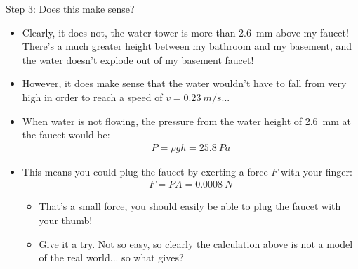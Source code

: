 \documentclass[aspectratio=169,
hyperref={colorlinks,urlcolor=blue}
]{beamer}
\begin{document}
\begin{frame}{Step 3: Does this make sense?}
\begin{itemize}
\item Clearly, it does not, the water tower is more than \SI{2.6}{mm} above my faucet! There's a much greater height between my bathroom and my basement, and the water doesn't explode out of my basement faucet!
\item However, it does make sense that the water wouldn't have to fall from very high in order to reach a speed of $v = \SI{0.23}{m/s}$...
\item When water is not flowing, the pressure from the water height of \SI{2.6}{mm} at the faucet would be:
\begin{align*}
P=\rho gh = \SI{25.8}{Pa}
\end{align*}
\item This means you could plug the faucet by exerting a force $F$ with your finger:
\begin{align*}
F=PA=\SI{0.0008}{N}
\end{align*}
\begin{itemize}
\item That's a small force, you should easily be able to plug the faucet with your thumb!
\item Give it a try. Not so easy, so clearly the calculation above is not a model of the real world... so what gives?
\end{itemize}

\end{itemize}
\end{frame}


\end{document}

